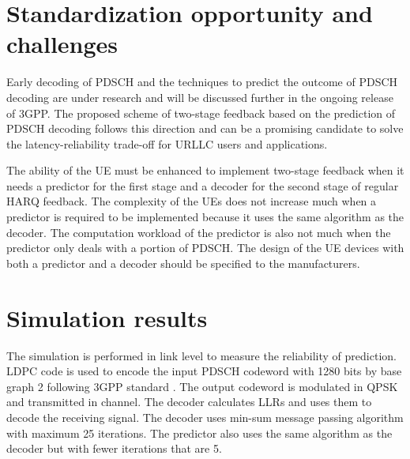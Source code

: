 \documentclass[conference]{IEEEtran}
\begin{document}
\section{Standardization opportunity and challenges}

Early decoding of PDSCH and the techniques to predict the outcome of PDSCH decoding are under research and will be discussed further in the ongoing release of 3GPP. The proposed scheme of two-stage feedback based on the prediction of PDSCH decoding follows this direction and can be a promising candidate to solve the latency-reliability trade-off for URLLC users and applications.

The ability of the UE must be enhanced to implement two-stage feedback when it needs a predictor for the first stage and a decoder for the second stage of regular HARQ feedback. The complexity of the UEs does not increase much when a predictor is required to be implemented because it uses the same algorithm as the decoder. The computation workload of the predictor is also not much when the predictor only deals with a portion of PDSCH. The design of the UE devices with both a predictor and a decoder should be specified to the manufacturers.  

\section{Simulation results} \label{VV}
The simulation is performed in link level to measure the reliability of prediction. LDPC code is used to encode the input PDSCH codeword with 1280 bits by base graph 2 following 3GPP standard \cite{b8}. The output codeword is modulated in QPSK and transmitted in channel. The decoder calculates LLRs and uses them to decode the receiving signal. The decoder uses min-sum message passing algorithm with maximum 25 iterations. The predictor also uses the same algorithm as the decoder but with fewer iterations that are 5.
\end{document}

